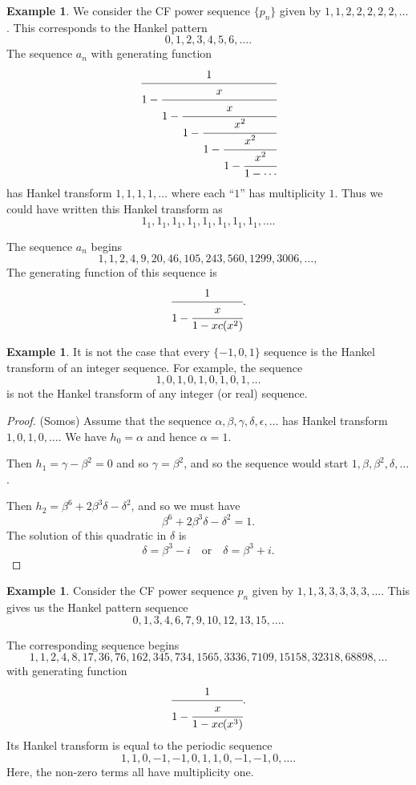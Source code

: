 \documentclass[12pt,reqno]{article}
\theoremstyle{definition}
\newtheorem{example}[theorem]{Example}
\begin{document}
\begin{example} We consider the CF power sequence $\{p_n\}$ given by $1,1,2,2,2,2,2,\ldots$. This corresponds to the Hankel pattern
$$0,1,2,3,4,5,6,\ldots.$$ The sequence $a_n$ with generating function
$$\cfrac{1}{1-
\cfrac{x}{1-
\cfrac{x}{1-
\cfrac{x^2}{1-
\cfrac{x^2}{1-
\cfrac{x^2}{1-
 \cdots}}}}}}$$
 has Hankel transform $1,1,1,1,\ldots$ where each ``$1$'' has multiplicity $1$. Thus we could have written this Hankel transform as
 $$1_1,1_1,1_1,1_1,1_1,1_1,1_1,1_1,\ldots.$$

\noindent The sequence $a_n$ begins
 $$1, 1, 2, 4, 9, 20, 46, 105, 243, 560, 1299, 3006, \ldots,$$
\noindent The generating function of this sequence is
$$\cfrac{1}{1-\cfrac{x}{1-x c(x^2)}}.$$

 \end{example}

\begin{example} It is not the case that every $\{-1,0,1\}$ sequence is the Hankel transform of an integer sequence. For example, the sequence $$1,0,1,0,1,0,1,0,1,\ldots $$ is not the Hankel transform of any integer (or real) sequence.
\begin{proof} (Somos)
Assume that the sequence $\alpha, \beta, \gamma, \delta, \epsilon,\ldots$ has Hankel transform $1,0,1,0,\ldots$.
We have $h_0=\alpha$ and hence $\alpha=1$. 

\noindent Then $h_1=\gamma-\beta^2=0$ and so $\gamma=\beta^2$, and so the sequence would start $1,\beta,\beta^2, \delta, \ldots$.

\noindent Then $h_2=\beta^6+2\beta^3 \delta-\delta^2$, and so we must have  
$$\beta^6+2\beta^3 \delta-\delta^2=1.$$ The solution of this quadratic in $\delta$ is 
$$ \delta=\beta^3-i \quad \text{or} \quad \delta=\beta^3+i.$$ 
\end{proof}


\end{example}

\begin{example} Consider the CF power sequence $p_n$ given by $1,1,3,3,3,3,3,\ldots$. This gives us the Hankel pattern sequence
$$0, 1, 3, 4, 6, 7, 9, 10, 12, 13, 15, \ldots.$$

The corresponding sequence begins
$$1, 1, 2, 4, 8, 17, 36, 76, 162, 345, 734, 1565, 3336, 7109, 15158, 32318, 68898, \ldots$$ with generating function  $$\cfrac{1}{1-\cfrac{x}{1-x c(x^3)}}.$$
\noindent Its Hankel transform is equal to the periodic sequence
$$1, 1, 0, -1, -1, 0, 1, 1, 0, -1, -1, 0, \ldots.$$
\noindent Here, the non-zero terms all have multiplicity one.
\end{example}
\end{document}
